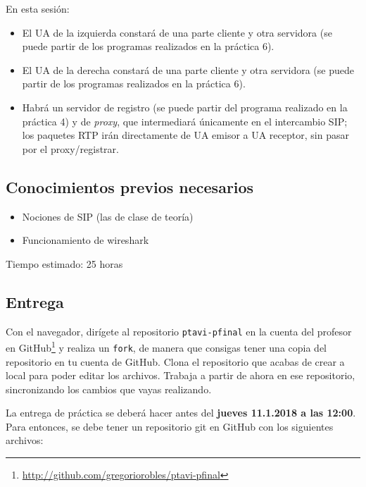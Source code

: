 \documentclass[a4paper,11pt]{article}
\begin{document}
En esta sesión:

\begin{itemize}
  \item El UA de la izquierda constará de una parte cliente y otra servidora (se puede partir de los programas realizados en la práctica 6).
  \item El UA de la derecha constará de una parte cliente y otra servidora (se puede partir de los programas realizados en la práctica 6).
  \item Habrá un servidor de registro (se puede partir del programa realizado en la práctica 4) y de \emph{proxy}, que intermediará únicamente en el intercambio SIP; los paquetes RTP irán directamente de UA emisor a UA receptor, sin pasar por el proxy/registrar.
\end{itemize}


\subsection{Conocimientos previos necesarios}

\begin{itemize}
  \item Nociones de SIP (las de clase de teoría)
  \item Funcionamiento de wireshark
\end{itemize}

Tiempo estimado: 25 horas


\subsection{Entrega}

Con el navegador, dirígete al repositorio \texttt{ptavi-pfinal} en la cuenta del profesor en GitHub\footnote{\url{http://github.com/gregoriorobles/ptavi-pfinal}} y realiza un \texttt{fork}, de manera que consigas tener una copia del repositorio en tu cuenta de GitHub. Clona el repositorio que acabas de crear a local para poder editar los archivos. Trabaja a partir de ahora en ese repositorio, sincronizando los cambios que vayas realizando.

La entrega de práctica se deberá hacer antes del {\bf jueves 11.1.2018 a las 12:00}. Para entonces, se debe tener un repositorio git en GitHub con los siguientes archivos:
\end{document}
